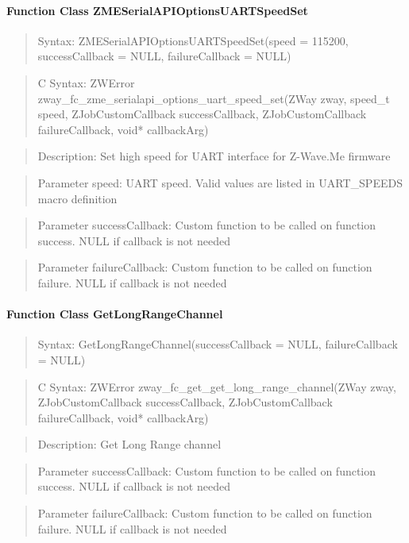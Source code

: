 \paragraph{Function Class ZMESerialAPIOptionsUARTSpeedSet}
\begin{quote}Syntax: ZMESerialAPIOptionsUARTSpeedSet(speed = 115200, successCallback = NULL, failureCallback = NULL)\end{quote}
\begin{quote}C Syntax: ZWError zway\_fc\_zme\_serialapi\_options\_uart\_speed\_set(ZWay zway, speed\_t speed, ZJobCustomCallback successCallback, ZJobCustomCallback failureCallback, void* callbackArg)\end{quote}
\begin{quote}Description: Set high speed for UART interface for Z-Wave.Me firmware\end{quote}
\begin{quote}Parameter speed: UART speed. Valid values are listed in UART\_SPEEDS macro definition\end{quote}
\begin{quote}Parameter successCallback: Custom function to be called on function success. NULL if callback is not needed\end{quote}
\begin{quote}Parameter failureCallback: Custom function to be called on function failure. NULL if callback is not needed\end{quote}


\paragraph{Function Class GetLongRangeChannel}
\begin{quote}Syntax: GetLongRangeChannel(successCallback = NULL, failureCallback = NULL)\end{quote}
\begin{quote}C Syntax: ZWError zway\_fc\_get\_get\_long\_range\_channel(ZWay zway, ZJobCustomCallback successCallback, ZJobCustomCallback failureCallback, void* callbackArg)\end{quote}
\begin{quote}Description: Get Long Range channel\end{quote}
\begin{quote}Parameter successCallback: Custom function to be called on function success. NULL if callback is not needed\end{quote}
\begin{quote}Parameter failureCallback: Custom function to be called on function failure. NULL if callback is not needed\end{quote}


